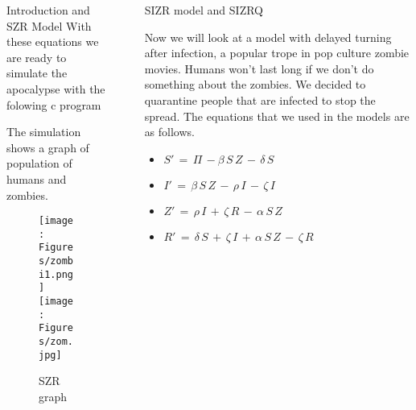 \documentclass[final]{beamer}
\newlength{\sepwid}
\newlength{\onecolwid}
\newlength{\twocolwid}
\begin{document}
\begin{frame}[t]
\begin{columns}[t]
\begin{column}{\onecolwid}
\begin{block}{Introduction and SZR Model}
With these equations we are ready to simulate the apocalypse with the folowing c program

\begin{tcolorbox}[breakable, title=\textbf{SZR.c}]

\end{tcolorbox}

The simulation shows a graph of population of humans and zombies.

\begin{figure}
\texttt{[image: Figures/zombi1.png]}
\texttt{[image: Figures/zom.jpg]}
\caption{ SZR graph }
\end{figure}



\end{block}
\end{column} 

\begin{column}{\sepwid}\end{column} 
\begin{column}{\twocolwid} 
\begin{columns}[t,totalwidth=\twocolwid] 
\begin{column}{\onecolwid}\vspace{-.6in} 



\begin{block}{SIZR model and SIZRQ}

Now we will look at a model with delayed turning after infection,
a popular trope in pop culture zombie movies.
Humans won't last long if we don't do something about the zombies.
We decided to quarantine people that are infected to stop the spread.
The equations that we used in the models are as follows.

\begin{small}
\begin{itemize}
\item $S'\,=\,\Pi\,-\beta\,S\,Z\,-\,\delta\,S$ 
\item $I'\,=\,\beta\,S\,Z\,-\,\rho\,I\,-\,\zeta\,I$
\item $Z'\,=\,\rho\,I\,+\,\zeta\,R\,-\,\alpha\,S\,Z$
\item $R'\,=\,\delta\,S\,+\,\zeta\,I\,+\,\alpha\,S\,Z\,-\,\zeta\,R$
\end{itemize}
\end{small}



\end{block}
\end{column}
\end{columns}
\end{column}
\end{columns}
\end{frame}
\end{document}
